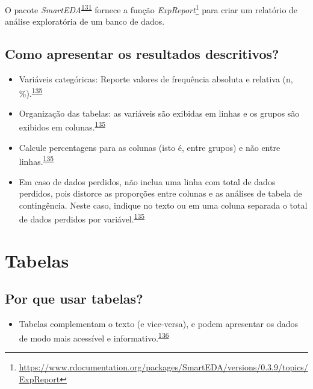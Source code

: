 \documentclass[
  a4paper,
]{book}
\providecommand{\tightlist}{%
  \setlength{\itemsep}{0pt}\setlength{\parskip}{0pt}}
\renewcommand{\href}[2]{#2\footnote{\url{#1}}}
\newenvironment{infobox}[1]
  {
  \begin{itemize}
  \renewcommand{\labelitemi}{
    \raisebox{-.7\height}[0pt][0pt]{
      {\setkeys{Gin}{width=3em,keepaspectratio}
        \texttt{[image: \#1]}}
    }
  }
  \setlength{\fboxsep}{1em}
  \begin{blackbox}
  \item
  }
  {
  \end{blackbox}
  \end{itemize}
  }
\begin{document}
\begin{infobox}{images/Rlogo}
O pacote \emph{SmartEDA}\textsuperscript{\protect\hyperlink{ref-SmartEDA}{131}} fornece a função \href{https://www.rdocumentation.org/packages/SmartEDA/versions/0.3.9/topics/ExpReport}{\emph{ExpReport}} para criar um relatório de análise exploratória de um banco de dados.

\end{infobox}

\hypertarget{como-apresentar-os-resultados-descritivos}{%
\subsection{Como apresentar os resultados descritivos?}\label{como-apresentar-os-resultados-descritivos}}

\begin{itemize}
\item
  Variáveis categóricas: Reporte valores de frequência absoluta e relativa (n, \%).\textsuperscript{\protect\hyperlink{ref-Cummings2003}{135}}
\item
  Organização das tabelas: as variáveis são exibidas em linhas e os grupos são exibidos em colunas.\textsuperscript{\protect\hyperlink{ref-Cummings2003}{135}}
\item
  Calcule percentagens para as colunas (isto é, entre grupos) e não entre linhas.\textsuperscript{\protect\hyperlink{ref-Cummings2003}{135}}
\item
  Em caso de dados perdidos, não inclua uma linha com total de dados perdidos, pois distorce as proporções entre colunas e as análises de tabela de contingência. Neste caso, indique no texto ou em uma coluna separada o total de dados perdidos por variável.\textsuperscript{\protect\hyperlink{ref-Cummings2003}{135}}
\end{itemize}

\hypertarget{tabelas}{%
\section{Tabelas}\label{tabelas}}

\hypertarget{por-que-usar-tabelas}{%
\subsection{Por que usar tabelas?}\label{por-que-usar-tabelas}}

\begin{itemize}
\tightlist
\item
  Tabelas complementam o texto (e vice-versa), e podem apresentar os dados de modo mais acessível e informativo.\textsuperscript{\protect\hyperlink{ref-Inskip2017}{136}}
\end{itemize}
\end{document}

